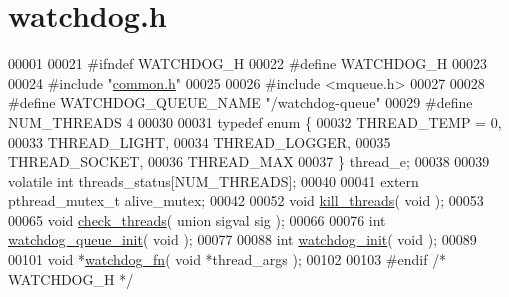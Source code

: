 \hypertarget{watchdog_8h_source}{}\section{watchdog.\+h}
\label{watchdog_8h_source}

\begin{DoxyCode}
00001 
00021 \textcolor{preprocessor}{#ifndef  WATCHDOG\_H}
00022 \textcolor{preprocessor}{#define  WATCHDOG\_H}
00023 
00024 \textcolor{preprocessor}{#include "\hyperlink{common_8h}{common.h}"}
00025 
00026 \textcolor{preprocessor}{#include <mqueue.h>}
00027 
00028 \textcolor{preprocessor}{#define WATCHDOG\_QUEUE\_NAME "/watchdog-queue"}
00029 \textcolor{preprocessor}{#define NUM\_THREADS 4}
00030 
00031 \textcolor{keyword}{typedef} \textcolor{keyword}{enum} \{
00032    THREAD\_TEMP = 0,
00033    THREAD\_LIGHT,
00034    THREAD\_LOGGER,
00035    THREAD\_SOCKET,
00036    THREAD\_MAX
00037 \} thread\_e;
00038 
00039 \textcolor{keyword}{volatile} \textcolor{keywordtype}{int} threads\_status[NUM\_THREADS];
00040 
00041 \textcolor{keyword}{extern} pthread\_mutex\_t alive\_mutex;
00042 
00052 \textcolor{keywordtype}{void} \hyperlink{watchdog_8h_afcff12ebeae3126251c60440eec3247b}{kill\_threads}( \textcolor{keywordtype}{void} );
00053 
00065 \textcolor{keywordtype}{void} \hyperlink{watchdog_8h_ad237b88f34b264a1c3c3965f765f730f}{check\_threads}( \textcolor{keyword}{union} sigval sig );
00066 
00076 \textcolor{keywordtype}{int} \hyperlink{watchdog_8h_afabbc670717ce1fd6b791b6c5a618517}{watchdog\_queue\_init}( \textcolor{keywordtype}{void} );
00077 
00088 \textcolor{keywordtype}{int} \hyperlink{watchdog_8h_a5fce3bd6c685cff6e3a4be0764c3a933}{watchdog\_init}( \textcolor{keywordtype}{void} );
00089 
00101 \textcolor{keywordtype}{void} *\hyperlink{watchdog_8h_ad69c59482b6b55ec28d5eb51bf01ce52}{watchdog\_fn}( \textcolor{keywordtype}{void} *thread\_args );
00102 
00103 \textcolor{preprocessor}{#endif   }\textcolor{comment}{/* WATCHDOG\_H */}\textcolor{preprocessor}{}
\end{DoxyCode}
